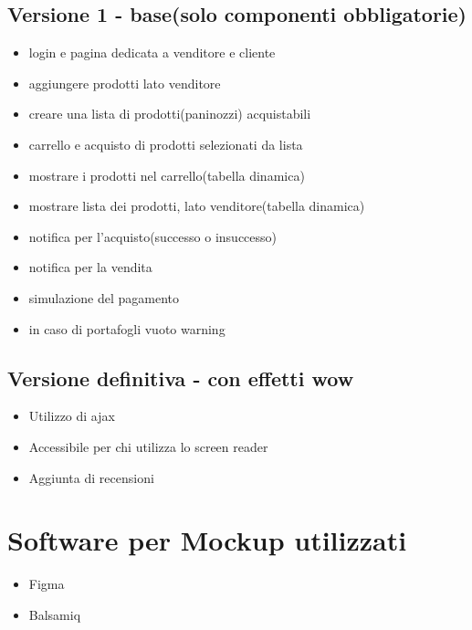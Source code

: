 \documentclass[a4paper,12pt]{report}
\begin{document}
	\subsection{Versione 1 - base(solo componenti obbligatorie)}
	\begin{itemize}
		\item login e pagina dedicata a venditore e cliente
		\item aggiungere prodotti lato venditore
		\item creare una lista di prodotti(paninozzi) acquistabili
		\item carrello e acquisto di prodotti selezionati da lista
		\item mostrare i prodotti nel carrello(tabella dinamica)
		\item mostrare lista dei prodotti, lato venditore(tabella dinamica)
		\item notifica per l'acquisto(successo o insuccesso)
		\item notifica per la vendita
		\item simulazione del pagamento
		\item in caso di portafogli vuoto warning
	\end{itemize}

	\subsection{Versione definitiva - con effetti wow}
	\begin{itemize}
		\item Utilizzo di ajax
		\item Accessibile per chi utilizza lo screen reader
		\item Aggiunta di recensioni 
	\end{itemize}

	\section{Software per Mockup utilizzati}
	
	\begin{itemize}
		\item Figma
		\item Balsamiq
	\end{itemize}

	
	\newpage
\end{document}
